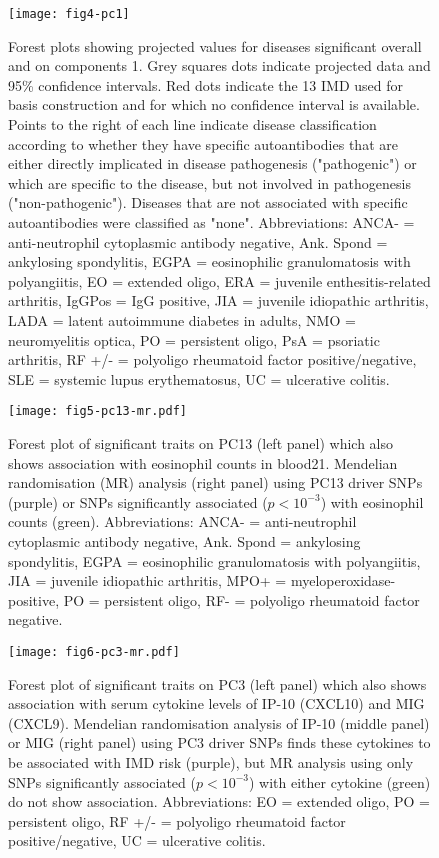 \documentclass[11pt]{article}
\begin{document}
\begin{figure}
  \centering
  \texttt{[image: fig4-pc1]}
  \caption{Forest plots showing projected values for diseases significant overall and on components 1. Grey squares dots indicate projected data and 95\% confidence intervals. Red dots indicate the 13 IMD used for basis construction and for which no confidence interval is available. Points to the right of each line indicate disease classification according to whether  they have specific autoantibodies that are either directly implicated in disease pathogenesis ("pathogenic") or which are specific to the disease, but not involved in pathogenesis ("non-pathogenic"). Diseases that are not associated with specific autoantibodies were classified as "none". Abbreviations: ANCA- = anti-neutrophil cytoplasmic antibody negative, Ank. Spond = ankylosing spondylitis, EGPA = eosinophilic granulomatosis with polyangiitis, EO = extended oligo, ERA = juvenile enthesitis-related arthritis, IgGPos = IgG positive, JIA = juvenile idiopathic arthritis, LADA = latent autoimmune diabetes in adults, NMO = neuromyelitis optica, PO = persistent oligo, PsA = psoriatic arthritis, RF +/- = polyoligo rheumatoid factor positive/negative, SLE = systemic lupus erythematosus, UC = ulcerative colitis.}
  \label{fig:4}
\end{figure}


\begin{figure}
  \centering
  \texttt{[image: fig5-pc13-mr.pdf]}
  \caption{Forest plot of significant traits on PC13 (left panel) which also shows association with eosinophil counts in blood21. Mendelian randomisation (MR) analysis (right panel) using PC13 driver SNPs (purple) or SNPs significantly associated ($p<10^{-3}$) with eosinophil counts (green).  Abbreviations: ANCA- = anti-neutrophil cytoplasmic antibody negative, Ank. Spond = ankylosing spondylitis, EGPA = eosinophilic granulomatosis with polyangiitis, JIA = juvenile idiopathic arthritis, MPO+ = myeloperoxidase-positive, PO = persistent oligo, RF- = polyoligo rheumatoid factor negative.}
  \label{fig:4}
\end{figure}

\begin{figure}
  \centering
  \texttt{[image: fig6-pc3-mr.pdf]}
  \caption{Forest plot of significant traits on PC3 (left panel) which also shows association with serum cytokine levels of IP-10 (CXCL10) and MIG (CXCL9). Mendelian randomisation analysis of IP-10 (middle panel) or MIG (right panel) using PC3 driver SNPs finds these cytokines to be associated with IMD risk (purple), but MR analysis using only SNPs significantly associated ($p<10^{-3}$) with either cytokine (green) do not show association. Abbreviations: EO = extended oligo, PO = persistent oligo,  RF +/- = polyoligo rheumatoid factor positive/negative, UC = ulcerative colitis.}
  \label{fig:4}
\end{figure}
\end{document}
